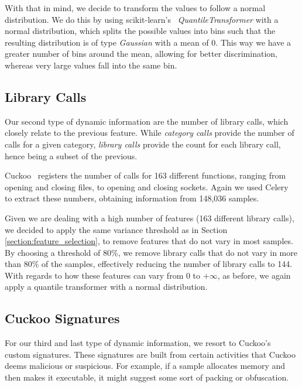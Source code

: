 With that in mind, we decide to transform the values to follow a normal distribution.
We do this by using scikit-learn's~\cite{tool:sklearn} \textit{QuantileTransformer} with a normal distribution, which splits the possible values into bins such that the resulting distribution is of type \textit{Gaussian} with a mean of 0.
This way we have a greater number of bins around the mean, allowing for better discrimination, whereas very large values fall into the same bin.

\subsection{Library Calls}
\label{section:improvements_api_unigrams}

Our second type of dynamic information are the number of library calls, which closely relate to the previous feature.
While \textit{category calls} provide the number of calls for a given category, \textit{library calls} provide the count for each library call, hence being a subset of the previous.

Cuckoo~\cite{tool:cuckoo} registers the number of calls for 163 different functions, ranging from opening and closing files, to opening and closing sockets.
Again we used Celery~\cite{tool:celery} to extract these numbers, obtaining information from 148,036 samples.

Given we are dealing with a high number of features (163 different library calls), we decided to apply the same variance threshold as in Section \ref{section:feature_selection}, to remove features that do not vary in most samples.
By choosing a threshold of 80\%, we remove library calls that do not vary in more than 80\% of the samples, effectively reducing the number of library calls to 144.
With regards to how these features can vary from 0 to $+\infty$, as before, we again apply a quantile transformer with a normal distribution.

\subsection{Cuckoo Signatures}
\label{section:improvements_categories}

For our third and last type of dynamic information, we resort to Cuckoo's~\cite{tool:cuckoo} custom signatures.
These signatures are built from certain activities that Cuckoo deems malicious or suspicious.
For example, if a sample allocates memory and then makes it executable, it might suggest some sort of packing or obfuscation.

